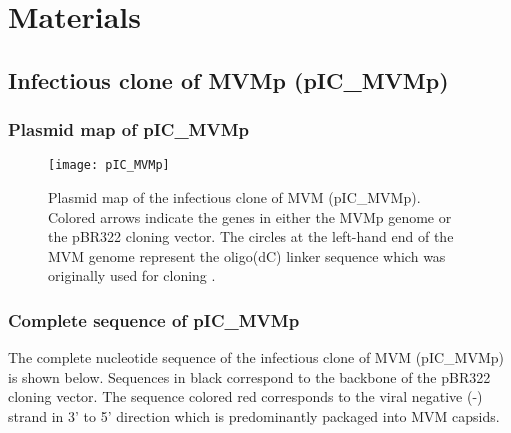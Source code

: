 
\chapter{Materials} %

\label{Materials} %


\section{Infectious clone of MVMp (pIC\_MVMp)}
\label{IC}


\subsection{Plasmid map of pIC\_MVMp}

\begin{figure}[h] 
\begin{center}
\texttt{[image: pIC\_MVMp]}
\caption[Plasmid map of the infectious clone of MVMp]{Plasmid map of the infectious clone of MVM (pIC\_MVMp). Colored arrows indicate the genes in either the MVMp genome or the pBR322 cloning vector. The circles at the left-hand end of the MVM genome represent the oligo(dC) linker sequence which was originally used for cloning \cite{pmid6345805}.}
\label{pIC}
\end{center}
\end{figure}

\newpage

\subsection{Complete sequence of pIC\_MVMp}
\label{sequence}

\raggedright
The complete nucleotide sequence of the infectious clone of MVM (pIC\_MVMp) is shown below. Sequences in black correspond to the backbone of the pBR322 cloning vector. The sequence colored red corresponds to the viral negative (-) strand in 3' to 5' direction which is predominantly packaged into MVM capsids.  


